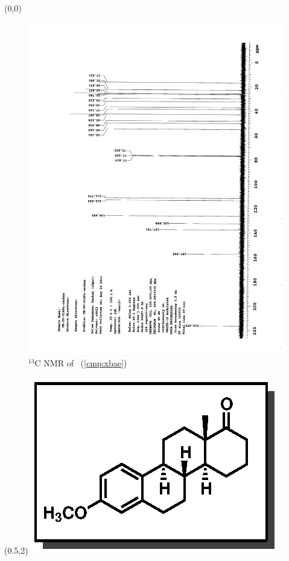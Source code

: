 \clearpage
\begin{textblock}{20}(0,0)
\begin{figure}[htb]
\caption{$^{13}$C NMR of  \CMPxbae\ (\ref{cmp:xbae})}
\includegraphics[scale=0.75, trim = 0mm 0mm 0mm 5mm,
clip]{chp_singlecarbon/images/nmr/xbaeC}
\vspace{-100pt}
\end{figure}
\end{textblock}
\begin{textblock}{1}(0.5,2)
\includegraphics[scale=0.8, angle=90]{chp_singlecarbon/images/xbae}
\end{textblock}
\clearpage

